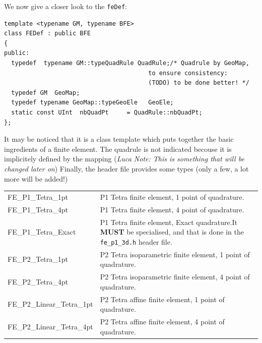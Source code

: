 We now give a closer look to the \texttt{feDef}: 
\begin{verbatim}
template <typename GM, typename BFE>
class FEDef : public BFE
{
public:
  typedef  typename GM::typeQuadRule QuadRule;/* Quadrule by GeoMap, 
                                        to ensure consistency:
                                        (TODO) to be done better! */
  typedef GM  GeoMap;
  typedef typename GeoMap::typeGeoEle   GeoEle;
  static const UInt  nbQuadPt     = QuadRule::nbQuadPt;
};
\end{verbatim}
It may be noticed that it is a class template which puts together the
basic ingredients of a finite element. The quadrule is not indicated
becouse it is implicitely defined by the mapping (\textsl{Luca Note:
  This is something that will be changed later on})
Finally, the header file provides some types (only a few, a lot more
will be added!)

\begin{tabularx}{\textwidth}{>{\ttfamily}lX}
  \hline 
FE\_P1\_Tetra\_1pt&  P1 Tetra finite element, 1 point of quadrature.\\
FE\_P1\_Tetra\_4pt&  P1 Tetra finite element, 4 point of quadrature.\\
FE\_P1\_Tetra\_Exact& P1 Tetra finite element, Exact quadrature.It
\textbf{MUST} be specialised, and that is done in the
\texttt{fe\_p1\_3d.h} header file.\\
FE\_P2\_Tetra\_1pt&  P2 Tetra isoparametric finite element, 1 point of quadrature.\\
FE\_P2\_Tetra\_4pt&  P2 Tetra isoparametric finite element, 4 point of quadrature.\\
FE\_P2\_Linear\_Tetra\_1pt&P2 Tetra affine finite element, 1 point of quadrature.\\
FE\_P2\_Linear\_Tetra\_4pt&P2 Tetra affine finite element, 4 point of
quadrature.\\
\hline
\end{tabularx}
\medskip


